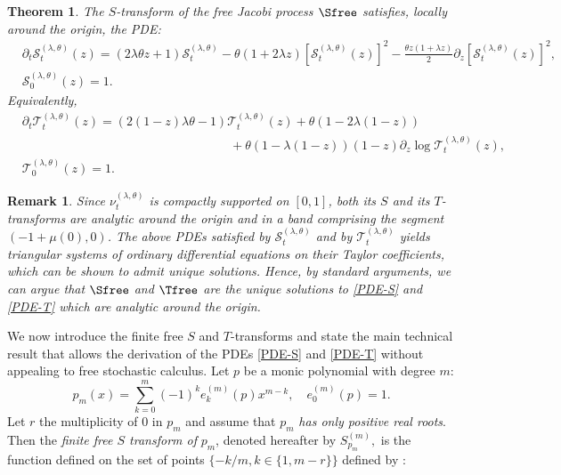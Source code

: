 \documentclass[12pt,reqno]{amsart}
\newtheorem{theorem}{Theorem}
\newtheorem{remark}{Remark}
\begin{document}
\begin{theorem}
	\label{thm:derivationfreestransform}
	The $S$-transform of the free Jacobi process $\Sfree$ satisfies, locally around the origin, the PDE:
	\begin{align}\label{PDE-S}
		&\partial_t \mathcal{S}_t^{(\lambda,\theta)}(z) =  (2\lambda \theta z+1) \mathcal{S}_t^{(\lambda,\theta)}
		-\theta (1+2\lambda z)[\mathcal{S}_t^{(\lambda,\theta)}(z)]^2 -\frac{\theta z (1+\lambda z)}{2}\partial_z[\mathcal{S}_t^{(\lambda,\theta)}(z)]^2, 
        \\ 
        &\mathcal{S}_0^{(\lambda,\theta)}(z) = 1. \nonumber
	\end{align} 
    Equivalently,
    \begin{align}\label{PDE-T}
    	&\partial_t \mathcal{T}_t^{(\lambda,\theta)}(z) = (2(1-z)\lambda\theta -1)\mathcal{T}_t^{(\lambda,\theta)}(z) + \theta(1-2\lambda (1-z)) \\
		&\hspace{7cm}+ \theta(1-\lambda{(1-z)})(1-z){\partial_{z}\log \mathcal{T}_t^{(\lambda,\theta)}(z)},\nonumber \\
		&\mathcal{T}_0^{(\lambda,\theta)}(z) = 1. \nonumber
    \end{align}
\end{theorem}
\begin{remark} 
Since $\nu_t^{(\lambda,\theta)}$ is compactly supported on $[0,1]$, both its $S$ and its $T$-transforms are analytic around the origin and in a band comprising the segment $(-1+\mu(0),0)$. 
The above PDEs satisfied by $\mathcal{S}_t^{(\lambda,\theta)}$ and by $\mathcal{T}_t^{(\lambda,\theta)}$ yields triangular systems of ordinary differential equations on their Taylor coefficients, which can be shown to admit unique solutions. Hence, by standard arguments, we can argue that $\Sfree$ and $\Tfree$ are the unique solutions to \eqref{PDE-S} and \eqref{PDE-T} 
which are analytic around the origin.
\end{remark}
We now introduce the finite free $S$ and $T$-transforms and state the main technical result that allows the derivation of the PDEs \eqref {PDE-S} and \ref{PDE-T} without appealing to free stochastic calculus. Let $p$ be a monic polynomial with degree $m$:
$$
p_m(x) = \sum_{k=0}^m (-1)^k e^{(m)}_k(p) x^{m-k}, \quad e^{(m)}_0(p) = 1.
$$
Let $r$ the multiplicity of $0$ in $p_m$ and assume that $p_m$ \emph{has only positive real roots}.
Then the \emph{finite free $S$ transform of} $p_m$, denoted hereafter by $S^{(m)}_{p_m},$ is the function defined on the set of points $\{-k/m, k \in \{1,m-r\} \}$ defined by \cite{arizmendi2024s}:
\end{document}

